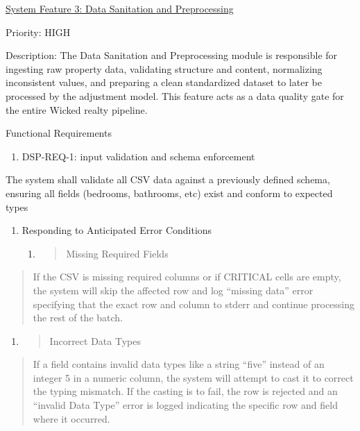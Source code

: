 \ul{System Feature 3: Data Sanitation and Preprocessing}

Priority: HIGH

Description: The Data Sanitation and Preprocessing module is responsible
for ingesting raw property data, validating structure and content,
normalizing inconsistent values, and preparing a clean standardized
dataset to later be processed by the adjustment model. This feature acts
as a data quality gate for the entire Wicked realty pipeline.

Functional Requirements

\begin{enumerate}
\def\labelenumi{\Roman{enumi})}
\item
  DSP-REQ-1: input validation and schema enforcement
\end{enumerate}

The system shall validate all CSV data against a previously defined
schema, ensuring all fields (bedrooms, bathrooms, etc) exist and conform
to expected types

\begin{enumerate}
\def\labelenumi{\alph{enumi}.}
\item
  Responding to Anticipated Error Conditions

  \begin{enumerate}
  \def\labelenumii{\roman{enumii}.}
  \item
    \begin{quote}
    Missing Required Fields
    \end{quote}
  \end{enumerate}
\end{enumerate}

\begin{quote}
If the CSV is missing required columns or if CRITICAL cells are empty,
the system will skip the affected row and log ``missing data'' error
specifying that the exact row and column to stderr and continue
processing the rest of the batch.
\end{quote}

\begin{enumerate}
\def\labelenumi{\roman{enumi}.}
\setcounter{enumi}{1}
\item
  \begin{quote}
  Incorrect Data Types
  \end{quote}
\end{enumerate}

\begin{quote}
If a field contains invalid data types like a string ``five'' instead of
an integer 5 in a numeric column, the system will attempt to cast it to
correct the typing mismatch. If the casting is to fail, the row is
rejected and an ``invalid Data Type'' error is logged indicating the
specific row and field where it occurred.
\end{quote}

